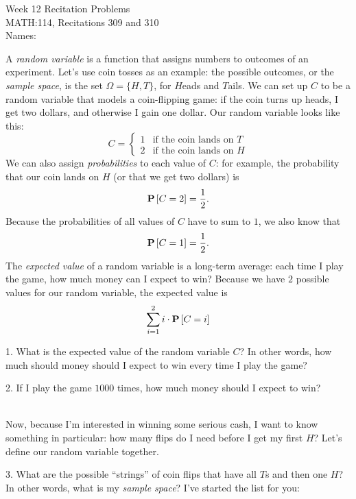 \documentclass[10pt]{article}
\newcommand{\prob}[1]{\mathbf{P}\hspace{-0.2pt}\left[#1\right]}
\begin{document}
	\thispagestyle{empty}
	{
		\centering
		\huge{Week 12 Recitation Problems} \\
		\Large{MATH:114, Recitations 309 and 310} \\[2em]
	}
	\normalsize{Names:} \hrulefill
	\vspace{2em}
	
	A \textit{random variable} is a function that assigns numbers to outcomes of an experiment. Let's use coin tosses as an example: the possible outcomes, or the \textit{sample space}, is the set $ \Omega = \{H, T\}$, for $H$eads and $T$ails. We can set up $C$ to be a random variable that models a coin-flipping game: if the coin turns up heads, I get two dollars, and otherwise I gain one dollar. Our random variable looks like this: $$ C = \begin{cases} 1 & \text{if the coin lands on $T$} \\ 2  & \text{if the coin lands on $H$} \end{cases}$$ We can also assign \textit{probabilities} to each value of $C$: for example, the probability that our coin lands on $H$ (or that we get two dollars) is $$ \prob{C = 2} = \frac{1}{2}.$$ Because the probabilities of all values of $C$ have to sum to $1$, we also know that $$ \prob{C=1} = \frac 12.$$ The \textit{expected value} of a random variable is a long-term average: each time I play the game, how much money can I expect to win? Because we have $2$ possible values for our random variable, the expected value is $$ \sum_{i=1}^2 i \cdot \prob{C = i}$$
	
	
	\vspace{1em}
	1. What is the expected value of the random variable $C$? In other words, how much should money should I expect to win every time I play the game?
	
	\vspace{6em}
	2. If I play the game $1000$ times, how much money should I expect to win?
	
	\vspace{6em}
	\dotfill \\[1em]
	
	Now, because I'm interested in winning some serious cash, I want to know something in particular: how many flips do I need before I get my first $H$? Let's define our random variable together.
	
	\vspace{1em}
	3. What are the possible ``strings'' of coin flips that have all $T$s and then one $H$? In other words, what is my \textit{sample space}? I've started the list for you: \vspace{-2em}
	
\end{document}
